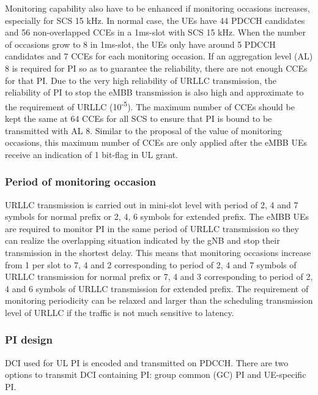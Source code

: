 \documentclass{ieeeaccess}
\begin{document}
Monitoring capability also have to be enhanced if monitoring occasions increases, especially for SCS 15 kHz. In normal case, the UEs have 44 PDCCH candidates and 56 non-overlapped CCEs in a 1ms-slot with SCS 15 kHz. When the number of occasions grow to 8 in 1ms-slot, the UEs only have around 5 PDCCH candidates and 7 CCEs for each monitoring occasion. If an aggregation level (AL) 8 is required for PI so as to guarantee the reliability, there are not enough CCEs for that PI. Due to the very high reliability of URLLC transmission, the reliability of PI to stop the eMBB transmission is also high and approximate to the requirement of URLLC (10\textsuperscript{-5}). The maximum number of CCEs should be kept the same at 64 CCEs for all SCS to ensure that PI is bound to be transmitted with AL 8. Similar to the proposal of the value of monitoring occasions, this maximum number of CCEs are only applied after the eMBB UEs receive an indication of 1 bit-flag in UL grant.

\subsubsection{Period of monitoring occasion}
URLLC transmission is carried out in mini-slot level with period of 2, 4 and 7 symbols for normal prefix or 2, 4, 6 symbols for extended prefix. The eMBB UEs are required to monitor PI in the same period of URLLC transmission so they can realize the overlapping situation indicated by the gNB and stop their transmission in the shortest delay. This means that monitoring occasions increase from 1 per slot to 7, 4 and 2 corresponding to period of 2, 4 and 7 symbols of URLLC transmission for normal prefix or 7, 4 and 3 corresponding to period of 2, 4 and 6 symbols of URLLC transmission for extended prefix. The requirement of monitoring periodicity can be relaxed and larger than the scheduling transmission level of URLLC if the traffic is not much sensitive to latency. 

\subsubsection {PI design}

DCI used for UL PI is encoded and transmitted on PDCCH. There are two options to transmit DCI containing PI: group common (GC) PI and UE-specific PI.
\end{document}
